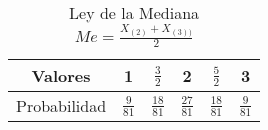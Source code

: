 \documentclass{article}
\begin{document}
      \begin{table}[H]
        \centering
        \begin{tabular}{ c | c c c c c|}
          Valores       & 1               & $\frac{3}{2}$   & 2               & $\frac{5}{2}$   & 3               \\ \hline
          Probabilidad  & $\frac{9}{81}$  & $\frac{18}{81}$ & $\frac{27}{81}$ & $\frac{18}{81}$ & $\frac{9}{81}$
        \end{tabular}
        \caption{Ley de la Mediana $Me = \frac{X_{(2)}+X_{(3))}}{2}$ }
        \label{}
      \end{table}

  \nocite{prob2017}


  
  
\end{document}
